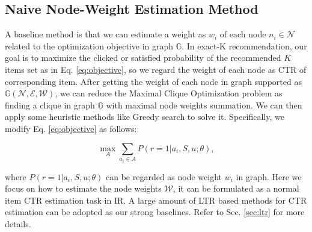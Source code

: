 \subsection{Naive Node-Weight Estimation Method}
\label{sec:nnwem}
A baseline method is that we can estimate a weight as $w_i$ of each node $n_i\in \mathcal{N}$ related to the optimization objective in graph $\mathbb{G}$.
In exact-K recommendation, our goal is to maximize the clicked or satisfied probability of the recommended $K$ items set as in Eq. \ref{eq:objective},
so we regard the weight of each node as CTR of corresponding item.
After getting the weight of each node in graph supported as $\mathbb{G}(\mathcal{N},\mathcal{E},\mathcal{W})$,
we can reduce the Maximal Clique Optimization problem as  
finding a clique in graph $\mathbb{G}$ with maximal node weights summation.
We can then apply some heuristic methods like Greedy search to solve it.
Specifically, we modify Eq. \ref{eq:objective} as follows:
\begin{small}
\begin{equation}
	\max\limits_{A} \sum_{a_i\in A}{P(r=1|a_i,S,u;\theta)},
\end{equation}
\end{small}
where $P(r=1|a_i,S,u;\theta)$ can be regarded as node weight $w_i$ in graph.
Here we focus on how to estimate the node weights $\mathcal{W}$,
it can be formulated as a normal item CTR estimation task in IR.
A large amount of LTR based methods for CTR estimation can be adopted as our strong baselines. Refer to Sec. \ref{sec:ltr} for more details. 

